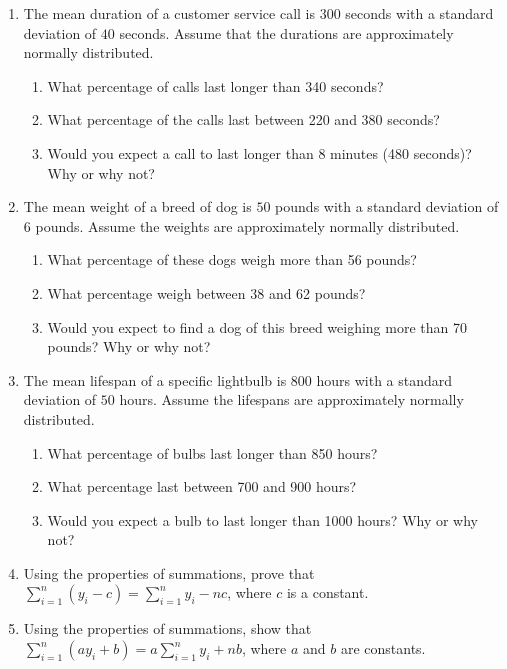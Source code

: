 \documentclass[11pt]{article}
\begin{document}
\begin{enumerate}
\item The mean duration of a customer service call is $300$ seconds with a standard deviation of $40$ seconds. Assume that the durations are approximately normally distributed.
\begin{enumerate}
    \item What percentage of calls last longer than 340 seconds?
    \item What percentage of the calls last between 220 and 380 seconds?
    \item Would you expect a call to last longer than 8 minutes (480 seconds)? Why or why not?
\end{enumerate}

\item The mean weight of a breed of dog is $50$ pounds with a standard deviation of $6$ pounds. Assume the weights are approximately normally distributed.
\begin{enumerate}
    \item What percentage of these dogs weigh more than 56 pounds?
    \item What percentage weigh between 38 and 62 pounds?
    \item Would you expect to find a dog of this breed weighing more than 70 pounds? Why or why not?
\end{enumerate}

\item The mean lifespan of a specific lightbulb is $800$ hours with a standard deviation of $50$ hours. Assume the lifespans are approximately normally distributed.
\begin{enumerate}
    \item What percentage of bulbs last longer than 850 hours?
    \item What percentage last between 700 and 900 hours?
    \item Would you expect a bulb to last longer than 1000 hours? Why or why not?
\end{enumerate}

\item Using the properties of summations, prove that $\sum_{i=1}^{n} (y_i - c) = \sum_{i=1}^{n} y_i - nc$, where $c$ is a constant.

\item Using the properties of summations, show that $\sum_{i=1}^{n} (ay_i + b) = a\sum_{i=1}^{n} y_i + nb$, where $a$ and $b$ are constants.


\end{enumerate}
\end{document}
